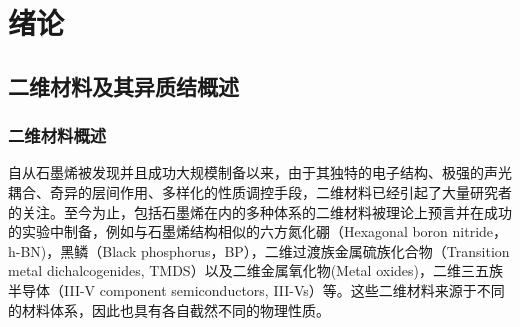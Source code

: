 \chapter{绪\hspace{6pt}论}

\section{二维材料及其异质结概述}
\subsection{二维材料概述}
自从石墨烯被发现并且成功大规模制备以来，由于其独特的电子结构、极强的声光耦合、奇异的层间作用、多样化的性质调控手段，二维材料已经引起了大量研究者的关注。至今为止，包括石墨烯在内的多种体系的二维材料被理论上预言并在成功的实验中制备，例如与石墨烯结构相似的六方氮化硼（Hexagonal boron nitride，h-BN)，黑鳞（Black phosphorus，BP），二维过渡族金属硫族化合物（Transition metal dichalcogenides, TMDS）以及二维金属氧化物(Metal oxides)，二维三五族半导体（III-V component semiconductors, III-Vs）等。这些二维材料来源于不同的材料体系，因此也具有各自截然不同的物理性质。%

